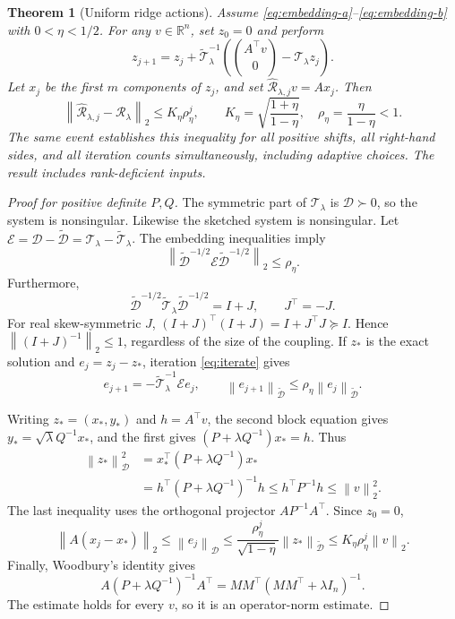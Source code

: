 \documentclass[11pt]{article}
\newtheorem{theorem}{Theorem}
\theoremstyle{remark}
\newcommand{\R}{\mathbb R}
\newcommand{\norm}[1]{\left\lVert#1\right\rVert}
\begin{document}
\begin{theorem}[Uniform ridge actions]\label{thm:ridge}
Assume \eqref{eq:embedding-a}--\eqref{eq:embedding-b} with
\(0<\eta<1/2\). For any \(v\in\R^n\), set \(z_0=0\) and perform
\begin{equation}\label{eq:iterate}
 z_{j+1}=z_j+\widetilde{\mathcal T}_\lambda^{-1}
       \left(\binom{A^\top v}{0}-\mathcal T_\lambda z_j\right).
\end{equation}
Let \(x_j\) be the first \(m\) components of \(z_j\), and set
\(\widehat{\mathcal R}_{\lambda,j}v=Ax_j\). Then
\begin{equation}\label{eq:ridge-bound}
 \norm{\widehat{\mathcal R}_{\lambda,j}-\mathcal R_\lambda}_2
 \leq K_\eta\rho_\eta^j,
 \qquad
 K_\eta=\sqrt{\frac{1+\eta}{1-\eta}},\quad
 \rho_\eta=\frac{\eta}{1-\eta}<1.
\end{equation}
The same event establishes this inequality for all positive shifts, all
right-hand sides, and all iteration counts simultaneously, including adaptive
choices. The result includes rank-deficient inputs.
\end{theorem}

\begin{proof}[Proof for positive definite \(P,Q\)]
The symmetric part of \(\mathcal T_\lambda\) is \(\mathcal D\succ0\),
so the system is nonsingular. Likewise the sketched system is nonsingular.
Let
\(\mathcal E=\mathcal D-\widetilde{\mathcal D}
             =\mathcal T_\lambda-\widetilde{\mathcal T}_\lambda\).
The embedding inequalities imply
\[
 \norm{\widetilde{\mathcal D}^{-1/2}\mathcal E
                \widetilde{\mathcal D}^{-1/2}}_2\leq\rho_\eta.
\]
Furthermore,
\[
 \widetilde{\mathcal D}^{-1/2}\widetilde{\mathcal T}_\lambda
       \widetilde{\mathcal D}^{-1/2}=I+J,\qquad J^\top=-J.
\]
For real skew-symmetric \(J\),
\((I+J)^\top(I+J)=I+J^\top J\succeq I\). Hence
\(\norm{(I+J)^{-1}}_2\leq1\), regardless of the size of the coupling.
If \(z_*\) is the exact solution and \(e_j=z_j-z_*\), iteration
\eqref{eq:iterate} gives
\[
 e_{j+1}=-\widetilde{\mathcal T}_\lambda^{-1}\mathcal E e_j,
 \qquad
 \norm{e_{j+1}}_{\widetilde{\mathcal D}}
 \leq\rho_\eta\norm{e_j}_{\widetilde{\mathcal D}}.
\]

Writing \(z_*=(x_*,y_*)\) and \(h=A^\top v\), the second block equation
gives \(y_*=\sqrt\lambda Q^{-1}x_*\), and the first gives
\((P+\lambda Q^{-1})x_*=h\). Thus
\begin{align*}
 \norm{z_*}_{\mathcal D}^2
 &=x_*^\top(P+\lambda Q^{-1})x_*\\
 &=h^\top(P+\lambda Q^{-1})^{-1}h
 \leq h^\top P^{-1}h\leq\norm v_2^2.
\end{align*}
The last inequality uses the orthogonal projector \(AP^{-1}A^\top\).
Since \(z_0=0\),
\[
 \norm{A(x_j-x_*)}_2
 \leq\norm{e_j}_{\mathcal D}
 \leq\frac{\rho_\eta^j}{\sqrt{1-\eta}}
                         \norm{z_*}_{\widetilde{\mathcal D}}
 \leq K_\eta\rho_\eta^j\norm v_2.
\]
Finally, Woodbury's identity gives
\[
 A(P+\lambda Q^{-1})^{-1}A^\top
 =MM^\top(MM^\top+\lambda I_n)^{-1}.
\]
The estimate holds for every \(v\), so it is an operator-norm estimate.
\end{proof}
\end{document}

